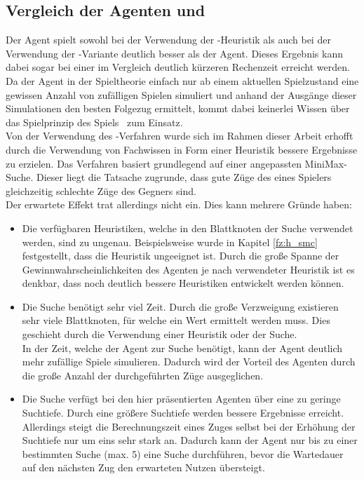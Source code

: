 \subsection{Vergleich der Agenten \mxZitat{\mc} und \mxZitat{\abp}}
\authorpatrick
\label{subsec:Fazit:AgentenVgl}
Der \mxZitat{\mc} Agent spielt sowohl bei der Verwendung der -Heuristik als auch bei der Verwendung der \mc -Variante deutlich besser als der \mxZitat{\abp} Agent. Dieses Ergebnis kann dabei sogar bei einer im Vergleich deutlich kürzeren Rechenzeit erreicht werden.
\\Da der \mxZitat{\mc} Agent in der Spieltheorie einfach nur ab einem aktuellen Spielzustand eine gewissen Anzahl von zufälligen Spielen simuliert und anhand der Ausgänge dieser Simulationen den besten Folgezug ermittelt, kommt dabei keinerlei Wissen über das Spielprinzip des Spiels \ot\ zum Einsatz. 
\\Von der Verwendung des \mxZitat{\abab}-Verfahren wurde sich im Rahmen dieser Arbeit erhofft durch die Verwendung von Fachwissen in Form einer Heuristik bessere Ergebnisse zu erzielen. Das Verfahren basiert grundlegend auf einer angepassten MiniMax-Suche. Dieser liegt die Tatsache zugrunde, dass gute Züge des eines Spielers gleichzeitig schlechte Züge des Gegners sind.
\\Der erwartete Effekt trat allerdings nicht ein. Dies kann mehrere Gründe haben:
\begin{itemize}
\item Die verfügbaren Heuristiken, welche in den Blattknoten der \mxZitat{\abp} Suche verwendet werden, sind zu ungenau. Beispielsweise wurde in Kapitel \ref{fz:h_smc} festgestellt, dass die Heuristik  ungeeignet ist. Durch die große Spanne der Gewinnwahrscheinlichkeiten des \mxZitat{\abp} Agenten je nach verwendeter Heuristik ist es denkbar, dass noch deutlich bessere Heuristiken entwickelt werden können.
\item Die \mxZitat{\abp} Suche benötigt sehr viel Zeit. Durch die große Verzweigung existieren sehr viele Blattknoten, für welche ein Wert ermittelt werden muss. Dies geschieht durch die Verwendung einer Heuristik oder der \mxZitat{\mc} Suche.
\\In der Zeit, welche der \mxZitat{\abp} Agent zur Suche benötigt, kann der \mxZitat{\mc} Agent deutlich mehr zufällige Spiele simulieren. Dadurch wird der Vorteil des \mxZitat{\abp} Agenten durch die große Anzahl der durchgeführten Züge ausgeglichen.
\item Die \mxZitat{\abp} Suche verfügt bei den hier präsentierten Agenten über eine zu geringe Suchtiefe. Durch eine größere Suchtiefe werden bessere Ergebnisse erreicht. Allerdings steigt die Berechnungszeit eines Zuges selbst bei der Erhöhung der Suchtiefe nur um eins sehr stark an. Dadurch kann der Agent nur bis zu einer bestimmten Suche (max. 5) eine \mxZitat{\abp} Suche durchführen, bevor die Wartedauer auf den nächsten Zug den erwarteten Nutzen übersteigt. 
\end{itemize} 

